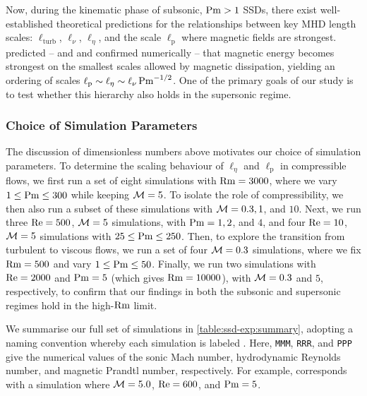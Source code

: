 Now, during the kinematic phase of subsonic, $\mathrm{Pm} > 1$ SSDs, there exist well-established theoretical predictions for the relationships between key MHD length scales: $\ell_\mathrm{turb}$, $\ell_\nu$, $\ell_\eta$, and the scale $\ell_\mathrm{p}$ where magnetic fields are strongest. \citet{schekochihin2002spectra, schekochihin2004simulations} predicted -- and  and \citet{brandenburg2023dissipative} confirmed numerically -- that magnetic energy becomes strongest on the smallest scales allowed by magnetic dissipation, yielding an ordering of scales $\ell_\mathrm{p} \sim \ell_\eta \sim \ell_\nu \, \mathrm{Pm}^{-1/2}$. One of the primary goals of our study is to test whether this hierarchy also holds in the supersonic regime.

\subsubsection{Choice of Simulation Parameters}

The discussion of dimensionless numbers above motivates our choice of simulation parameters. To determine the scaling behaviour of $\ell_\eta$ and $\ell_\mathrm{p}$ in compressible flows, we first run a set of eight simulations with $\mathrm{Rm} = 3000$, where we vary $1 \leq \mathrm{Pm} \leq 300$ while keeping $\mathcal{M} = 5$. To isolate the role of compressibility, we then also run a subset of these simulations with $\mathcal{M} = 0.3, 1$, and $10$. Next, we run three $\mathrm{Re} = 500$, $\mathcal{M} = 5$ simulations, with $\mathrm{Pm} = 1, 2$, and $4$, and four $\mathrm{Re} = 10$, $\mathcal{M} = 5$ simulations with $25 \leq \mathrm{Pm} \leq 250$. Then, to explore the transition from turbulent to viscous flows, we run a set of four $\mathcal{M} = 0.3$ simulations, where we fix $\mathrm{Rm} = 500$ and vary $1 \leq \mathrm{Pm} \leq 50$. Finally, we run two simulations with $\mathrm{Re} = 2000$ and $\mathrm{Pm} = 5$ (which gives $\mathrm{Rm} = 10000$), with $\mathcal{M} = 0.3$ and $5$, respectively, to confirm that our findings in both the subsonic and supersonic regimes hold in the high-$\mathrm{Rm}$ limit.

We summarise our full set of simulations in \autoref{table:ssd-exp:summary}, adopting a naming convention whereby each simulation is labeled . Here, \texttt{MMM}, \texttt{RRR}, and \texttt{PPP} give the numerical values of the sonic Mach number, hydrodynamic Reynolds number, and magnetic Prandtl number, respectively. For example,  corresponds with a simulation where $\mathcal{M} = 5.0$, $\mathrm{Re}=600$, and $\mathrm{Pm}=5$.

